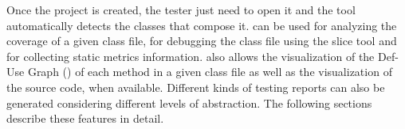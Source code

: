 Once the project is created, the tester just need to open it and
the tool automatically detects the classes that compose it.
\toolname can be used for analyzing the coverage of a given class
file, for debugging the class file using the slice tool and for
collecting static metrics information. \toolname also allows the
visualization of the Def-Use Graph (\DUG) of each method in a
given class file as well as the visualization of the source code,
when available. Different kinds of testing reports can also be
generated considering different levels of abstraction. The
following sections describe these features in detail.

